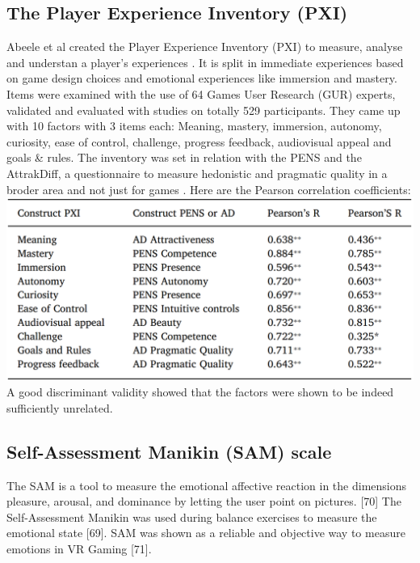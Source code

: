 \subsection{The Player Experience Inventory (PXI)}
Abeele et al created the Player Experience Inventory (PXI) to measure, analyse and understan a player's experiences \cite{abeele2020development}. It is split in immediate experiences based on game design choices and emotional experiences like immersion and mastery. Items were examined with the use of 64 Games User Research (GUR) experts, validated and evaluated with studies on totally 529 participants. They came up with 10 factors with 3 items each: Meaning, mastery, immersion, autonomy, curiosity, ease of control, challenge, progress feedback, audiovisual appeal and goals \& rules. The inventory was set in relation with the PENS and the AttrakDiff, a questionnaire to measure hedonistic and pragmatic quality in a broder area and not just for games \cite{hassenzahl2003attrakdiff}. Here are the Pearson correlation coefficients:
\includegraphics[width=\linewidth]{"PXI_vs_PENS.png"}
A good discriminant validity showed that the factors were shown to be indeed sufficiently unrelated.


\subsection{Self-Assessment Manikin (SAM) scale}
The SAM is a tool to measure the emotional affective reaction in the dimensions pleasure, arousal, and dominance by letting the user point on pictures. [70] The Self-Assessment Manikin was used during balance exercises to measure the emotional state [69]. SAM was shown as a reliable and objective way to measure emotions in VR Gaming [71].

